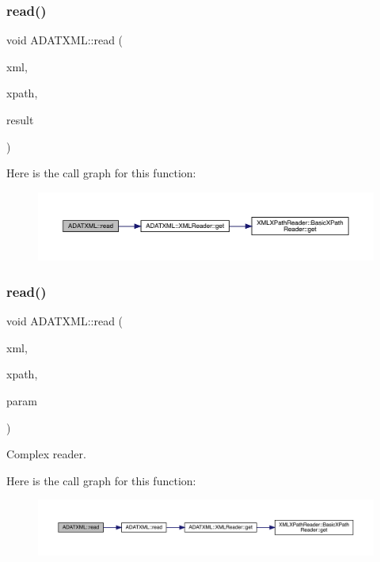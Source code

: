 \subsubsection{\texorpdfstring{read()}{read()}\hspace{0.1cm}{\footnotesize\ttfamily [10/52]}}
{\footnotesize\ttfamily void A\+D\+A\+T\+X\+M\+L\+::read (\begin{DoxyParamCaption}\item[{\mbox{\hyperlink{classADATXML_1_1XMLReader}{X\+M\+L\+Reader}} \&}]{xml,  }\item[{const std\+::string \&}]{xpath,  }\item[{bool \&}]{result }\end{DoxyParamCaption})}

Here is the call graph for this function\+:\nopagebreak
\begin{figure}[H]
\begin{center}
\leavevmode
\includegraphics[width=350pt]{d2/da3/group__io_ga9309cae5bd0340cc4ed71055808b6fac_cgraph}
\end{center}
\end{figure}
\mbox{\label{group__io_ga1287217ff7c9cbae6a6c958ee2de7776}} 
\subsubsection{\texorpdfstring{read()}{read()}\hspace{0.1cm}{\footnotesize\ttfamily [11/52]}}
{\footnotesize\ttfamily void A\+D\+A\+T\+X\+M\+L\+::read (\begin{DoxyParamCaption}\item[{\mbox{\hyperlink{classADATXML_1_1XMLReader}{X\+M\+L\+Reader}} \&}]{xml,  }\item[{const std\+::string \&}]{xpath,  }\item[{std\+::complex$<$ float $>$ \&}]{param }\end{DoxyParamCaption})}



Complex reader. 

Here is the call graph for this function\+:\nopagebreak
\begin{figure}[H]
\begin{center}
\leavevmode
\includegraphics[width=350pt]{d2/da3/group__io_ga1287217ff7c9cbae6a6c958ee2de7776_cgraph}
\end{center}
\end{figure}
\mbox{\label{group__io_gaf79f2861a8d55a3e88311959e646b0e1}} 
